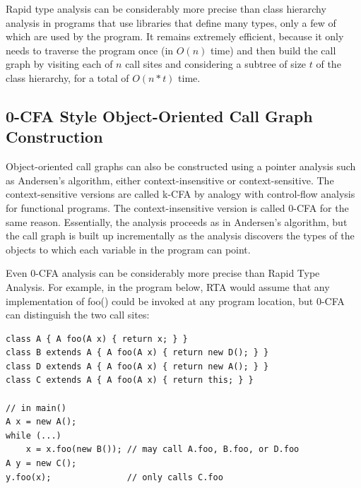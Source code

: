 \documentclass[11pt]{article}
\begin{document}
Rapid type analysis can be considerably more precise than class hierarchy
analysis in programs that use libraries that define many types, only a few of
which are used by the program. It remains extremely efficient, because it only
needs to traverse the program once (in $O(n)$ time) and then build the call
graph by visiting each of $n$ call sites and considering a subtree of size $t$
of the class hierarchy, for a total of $O(n*t)$ time.

\subsection{0-CFA Style Object-Oriented Call Graph Construction}

Object-oriented call graphs can also be constructed using a pointer analysis
such as Andersen's algorithm, either context-insensitive or context-sensitive.
The context-sensitive versions are called k-CFA by analogy with control-flow
analysis for functional programs. The context-insensitive version is called
0-CFA for the same reason. Essentially, the analysis proceeds as in Andersen's
algorithm, but the call graph is built up incrementally as the analysis
discovers the types of the objects to which each variable in the program can
point.

Even 0-CFA analysis can be considerably more precise than Rapid Type Analysis.
For example, in the program below, RTA would assume that any implementation of
foo() could be invoked at any program location, but 0-CFA can distinguish the
two call sites:

\begin{lstlisting}
class A { A foo(A x) { return x; } }
class B extends A { A foo(A x) { return new D(); } }
class D extends A { A foo(A x) { return new A(); } }
class C extends A { A foo(A x) { return this; } }

// in main()
A x = new A();
while (...)
    x = x.foo(new B()); // may call A.foo, B.foo, or D.foo
A y = new C();
y.foo(x);               // only calls C.foo
\end{lstlisting}
\end{document}
